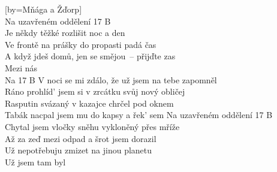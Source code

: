 [by={Mňága a Žďorp}]
\chordsoff
\freev
\chordson\cseq{\[Em] \[C] \[D] \[Hm]}\\
\cl
\freev
Na uzavřeném oddělení 17 B\\
Je někdy těžké rozlišit noc a den\\
Ve frontě na prášky do propasti padá čas\\
A když jdeš domů, jen se smějou~-- přijďte zas\\
Mezi nás\\
Na 17 B
\cl
\freev
V noci se mi zdálo, že už jsem na tebe zapomněl\\
Ráno prohlíd' jsem si v zrcátku svůj nový obličej\\
Rasputin svázaný v kazajce chrčel pod oknem\\
Tabák nacpal jsem mu do kapsy a řek' sem 
\cl
\freev
Na uzavřeném oddělení 17 B\\
Chytal jsem vločky sněhu vykloněný přes mříže\\
Až za zeď mezi odpad a šrot jsem dorazil\\
Už nepotřebuju zmizet na jinou planetu\\
Už jsem tam byl
\cl
\solo\emptyspace\\\cl
\endsong
